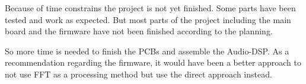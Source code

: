 Because of time constrains the project is not yet finished. Some parts have been tested and work as expected. But most parts of the project including the main board and the firmware have not been finished according to the planning.

So more time is needed to finish the PCBs and assemble the Audio-DSP. As a recommendation regarding the firmware, it would have been a better approach to not use FFT as a processing method but use the direct approach instead. 